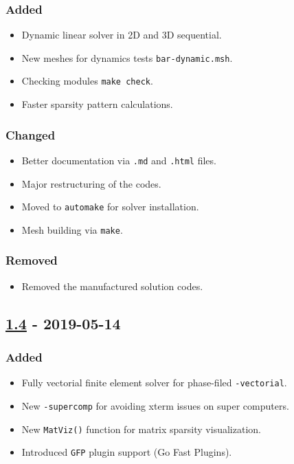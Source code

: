 \subsubsection{Added}

\begin{itemize}
\tightlist
\item
  Dynamic linear solver in 2D and 3D sequential.
\item
  New meshes for dynamics tests \lstinline!bar-dynamic.msh!.
\item
  Checking modules \lstinline!make check!.
\item
  Faster sparsity pattern calculations.
\end{itemize}

\subsubsection{Changed}

\begin{itemize}
\tightlist
\item
  Better documentation via \lstinline!.md! and \lstinline!.html! files.
\item
  Major restructuring of the codes.
\item
  Moved to \lstinline!automake! for solver installation.
\item
  Mesh building via \lstinline!make!.
\end{itemize}

\subsubsection{Removed}

\begin{itemize}
\tightlist
\item
  Removed the manufactured solution codes.
\end{itemize}

\subsection{\texorpdfstring{\href{https://gitlab.com/PsdSolver/psd_sources/-/tree/v1.4}{1.4}
- 2019-05-14}{1.4 - 2019-05-14}}

\subsubsection{Added}

\begin{itemize}
\tightlist
\item
  Fully vectorial finite element solver for phase-filed
  \lstinline!-vectorial!.
\item
  New \lstinline!-supercomp! for avoiding xterm issues on super
  computers.
\item
  New \lstinline!MatViz()! function for matrix sparsity visualization.
\item
  Introduced \lstinline!GFP! plugin support (Go Fast Plugins).
\end{itemize}

